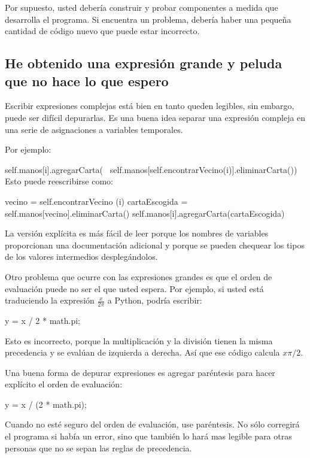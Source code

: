 Por supuesto, usted debería construir y probar componentes a medida
que desarrolla el programa. Si encuentra un problema, debería haber
una pequeña cantidad de código nuevo que puede estar incorrecto.

\subsection{He obtenido una expresión grande y peluda que no hace lo que espero}


Escribir expresiones complejas está bien en tanto queden legibles,
sin embargo, puede ser difícil depurarlas. Es una buena idea separar
una expresión compleja en una serie de asignaciones a variables temporales.

\pagebreak

Por ejemplo:
\begin{pythoncode}
self.manos[i].agregarCarta( \
  self.manos[self.encontrarVecino(i)].eliminarCarta())
 Esto puede reescribirse como:
 
vecino = self.encontrarVecino (i)
cartaEscogida = self.manos[vecino].eliminarCarta()
self.manos[i].agregarCarta(cartaEscogida)
\end{pythoncode}
 La versión explícita es más fácil de leer porque los nombres de variables
proporcionan una documentación adicional y porque se pueden chequear
los tipos de los valores intermedios desplegándolos.

  
\index{precedencia}

Otro problema que ocurre con las expresiones grandes es que el orden
de evaluación puede no ser el que usted espera. Por ejemplo, si usted
está traduciendo la expresión $\frac{x}{2\pi}$ a Python, podría escribir:

\begin{pythoncode}
y = x / 2 * math.pi;
\end{pythoncode}
 Esto es incorrecto, porque la multiplicación y la división tienen
la misma precedencia y se evalúan de izquierda a derecha. Así que
ese código calcula $x\pi/2$.

Una buena forma de depurar expresiones es agregar paréntesis para
hacer explícito el orden de evaluación:
\begin{pythoncode}
 y = x / (2 * math.pi);
\end{pythoncode}
 Cuando no esté seguro del orden de evaluación, use paréntesis. No
sólo corregirá el programa si había un error, sino que también lo
hará mas legible para otras personas que no se sepan las reglas de
precedencia.

